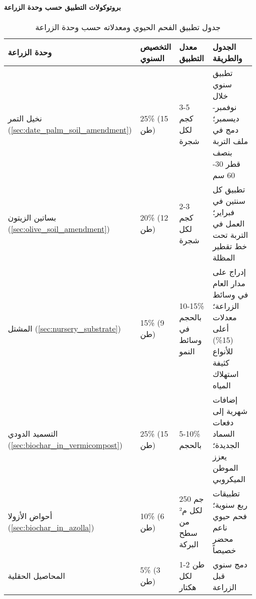 \paragraph{بروتوكولات التطبيق حسب وحدة الزراعة}
\label{sec:biochar_application}
\begin{table}[h]
\centering
\caption{جدول تطبيق الفحم الحيوي ومعدلاته حسب وحدة الزراعة}
\label{tab:biochar_application}
\begin{tabular}{|p{4cm}|p{2cm}|p{2.5cm}|p{5cm}|}
\hline
\textbf{وحدة الزراعة} & \textbf{التخصيص السنوي} & \textbf{معدل التطبيق} & \textbf{الجدول والطريقة} \\
\hline
نخيل التمر (\ref{sec:date_palm_soil_amendment}) & 25\% (15 طن) & 3-5 كجم لكل شجرة & تطبيق سنوي خلال نوفمبر-ديسمبر؛ دمج في ملف التربة بنصف قطر 30-60 سم \\
\hline
بساتين الزيتون (\ref{sec:olive_soil_amendment}) & 20\% (12 طن) & 2-3 كجم لكل شجرة & تطبيق كل سنتين في فبراير؛ العمل في التربة تحت خط تقطير المظلة \\
\hline
المشتل (\ref{sec:nursery_substrate}) & 15\% (9 طن) & 10-15\% بالحجم في وسائط النمو & إدراج على مدار العام في وسائط الزراعة؛ معدلات أعلى (15\%) للأنواع كثيفة استهلاك المياه \\
\hline
التسميد الدودي (\ref{sec:biochar_in_vermicompost}) & 25\% (15 طن) & 5-10\% بالحجم & إضافات شهرية إلى دفعات السماد الجديدة؛ يعزز الموطن الميكروبي \\
\hline
أحواض الأزولا (\ref{sec:biochar_in_azolla}) & 10\% (6 طن) & 250 جم لكل م² من سطح البركة & تطبيقات ربع سنوية؛ فحم حيوي ناعم محضر خصيصاً \\
\hline
المحاصيل الحقلية & 5\% (3 طن) & 1-2 طن لكل هكتار & دمج سنوي قبل الزراعة \\
\hline
\end{tabular}
\end{table}

